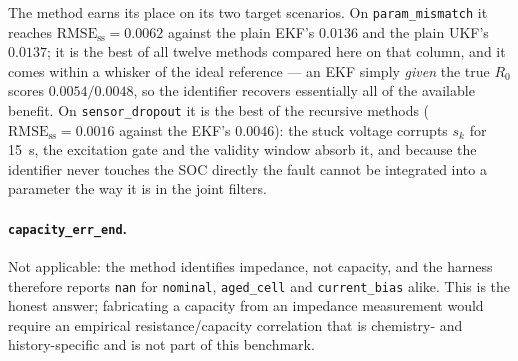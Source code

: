 The method earns its place on its two target scenarios.  On \texttt{param\_mismatch} it reaches
$\text{RMSE}_\text{ss}=0.0062$ against the plain EKF's $0.0136$ and the plain UKF's $0.0137$; it is
the best of all twelve methods compared here on that column, and it comes within a whisker of the
ideal reference --- an EKF simply \emph{given} the true $R_0$ scores $0.0054/0.0048$, so the
identifier recovers essentially all of the available benefit.  On \texttt{sensor\_dropout} it is the
best of the recursive methods ($\text{RMSE}_\text{ss}=0.0016$ against the EKF's $0.0046$): the stuck
voltage corrupts $s_k$ for \SI{15}{\second}, the excitation gate and the validity window absorb it,
and because the identifier never touches the SOC directly the fault cannot be integrated into a
parameter the way it is in the joint filters.

\paragraph{\texttt{capacity\_err\_end}.}  Not applicable: the method identifies impedance, not
capacity, and the harness therefore reports \texttt{nan} for \texttt{nominal},
\texttt{aged\_cell} and \texttt{current\_bias} alike.  This is the honest answer; fabricating a
capacity from an impedance measurement would require an empirical resistance/capacity correlation
that is chemistry- and history-specific and is not part of this benchmark.


